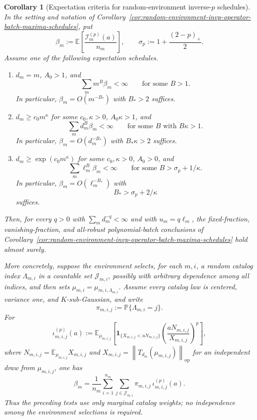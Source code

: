 \documentclass[11pt]{amsart}
\numberwithin{equation}{section}
\newtheorem{corollary}[theorem]{Corollary}
\theoremstyle{definition}
\theoremstyle{remark}
\newcommand{\op}{\mathrm{op}}
\newcommand{\Prob}{\mathbb P}
\newcommand{\Exp}{\mathbb E}
\newcommand{\norm}[1]{\left\lVert #1\right\rVert}
\begin{document}
\begin{corollary}[Expectation criteria for random-environment inverse-\(p\) schedules]
\label{cor:random-environment-invp-expectation-schedules}
In the setting and notation of
Corollary~\ref{cor:random-environment-invp-operator-batch-maxima-schedules},
put
\[
  \beta_m:=\Exp\left[\frac{\mathcal I_m^{(p)}(a)}{n_m}\right],
  \qquad
  \sigma_p:=1+\frac{(2-p)_+}{2}.
\]
Assume one of the following expectation schedules.
\begin{enumerate}[label=\textup{(\roman*)},leftmargin=2.2em]
\item \(d_m=m\), \(A_0>1\), and
\[
  \sum_m m^B\beta_m<\infty
  \qquad\text{for some }B>1.
\]
In particular, \(\beta_m=O(m^{-B_*})\) with \(B_*>2\) suffices.
\item \(d_m\ge c_0m^\kappa\) for some \(c_0,\kappa>0\), \(A_0\kappa>1\), and
\[
  \sum_m d_m^B\beta_m<\infty
  \qquad\text{for some }B\text{ with }B\kappa>1.
\]
In particular, \(\beta_m=O(d_m^{-B_*})\) with \(B_*\kappa>2\) suffices.
\item \(d_m\ge\exp(c_0m^\kappa)\) for some \(c_0,\kappa>0\), \(A_0>0\), and
\[
  \sum_m \ell_m^B\beta_m<\infty
  \qquad\text{for some }B>\sigma_p+1/\kappa .
\]
In particular, \(\beta_m=O(\ell_m^{-B_*})\) with
\[
  B_*>\sigma_p+2/\kappa
\]
suffices.
\end{enumerate}
Then, for every \(q>0\) with \(\sum_m d_m^{-q}<\infty\) and with
\(u_m=q\ell_m\), the fixed-fraction, vanishing-fraction, and all-robust
polynomial-batch conclusions of
Corollary~\ref{cor:random-environment-invp-operator-batch-maxima-schedules}
hold almost surely.

More concretely, suppose the environment selects, for each \(m,i\), a random
catalog index \(\Lambda_{m,i}\) in a countable set \(\mathcal J_{m,i}\),
possibly with arbitrary dependence among all indices, and then sets
\(\mu_{m,i}=\mu_{m,i,\Lambda_{m,i}}\).  Assume every catalog law is centered,
variance one, and \(K\)-sub-Gaussian, and write
\[
  \pi_{m,i,j}:=\Prob\{\Lambda_{m,i}=j\}.
\]
For
\[
  \iota_{m,i,j}^{(p)}(a):=
  \Exp_{\mu_{m,i,j}}\left[
  \mathbf 1_{\{X_{m,i,j}<aN_{m,i,j}\}}
  \left(\frac{aN_{m,i,j}}{X_{m,i,j}}\right)^p
  \right],
\]
where \(N_{m,i,j}=\Exp_{\mu_{m,i,j}}X_{m,i,j}\) and
\(X_{m,i,j}=\norm{T_{d_m}(\mu_{m,i,j})}_{\op}\) for an independent draw from
\(\mu_{m,i,j}\), one has
\[
  \beta_m=
  \frac1{n_m}
  \sum_{i=1}^{n_m}\sum_{j\in\mathcal J_{m,i}}
  \pi_{m,i,j}\,\iota_{m,i,j}^{(p)}(a).
\]
Thus the preceding tests use only marginal catalog weights; no independence
among the environment selections is required.
\end{corollary}
\end{document}
